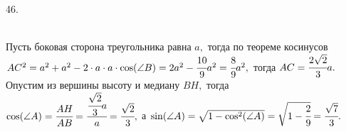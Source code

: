 \documentclass[12pt]{article}
\begin{document}
46. \begin{figure}[ht!]
\end{figure}\\
Пусть боковая сторона треугольника равна $a,$ тогда по теореме косинусов $AC^2=a^2+a^2-2\cdot a\cdot a\cdot \cos(\angle B)=2a^2-\cfrac{10}{9}a^2=\cfrac{8}{9}a^2,$
тогда $AC=\cfrac{2\sqrt{2}}{3}a.$ Опустим из вершины высоту и медиану $BH,$ тогда $\cos(\angle A)=\cfrac{AH}{AB}=\cfrac{\cfrac{\sqrt{2}}{3}a}{a}=\cfrac{\sqrt{2}}{3},$
а $\sin(\angle A)=\sqrt{1-\cos^2(\angle A)}=\sqrt{1-\cfrac{2}{9}}=\cfrac{\sqrt{7}}{3}.$\\
\end{document}
